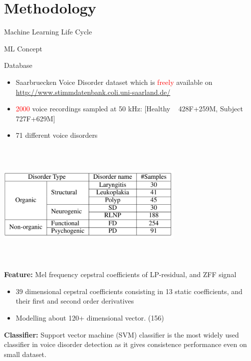 \documentclass{beamer}
\begin{document}
\section{Methodology}
\begin{frame}{\small Machine Learning Life Cycle}
\centering
\end{frame}
\begin{frame}{ML Concept}
\centering
\end{frame}
\begin{frame}{Database}
    \begin{itemize}
        \item Saarbruecken Voice Disorder dataset which is \textcolor{red}{freely} available on \url{http://www.stimmdatenbank.coli.uni-saarland.de/}
        \item \textcolor{red}{2000} voice recordings sampled at 50 kHz: [Healthy ~ 428F+259M, Subject ~ 727F+629M]
        \item 71 different voice disorders
    \end{itemize}
\end{frame}
\begin{frame}{}
\centering
\includegraphics[width=9cm, height=6cm]{SVDsummary.PNG}
\end{frame}
\begin{frame}{}
\textbf{Feature: }Mel frequency cepstral coefficients of LP-residual, and ZFF signal
\begin{itemize}
    \item 39 dimensional cepstral coefficients consisting in 13 static coefficients, and their first and second order derivatives
    \item Modelling about 120+ dimensional vector. (156)
\end{itemize}
\textbf{Classifier:} Support vector machine (SVM) classifier is the most widely used classifier in voice disorder detection as it gives consistence performance even on small dataset. 
\end{frame}
\end{document}
